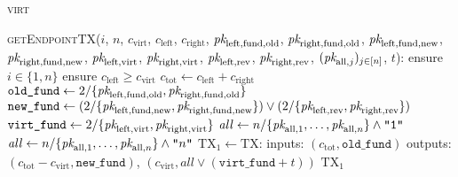 \begin{center}
  \begin{processbox}{\textsc{virt}}
    \begin{algorithmic}[1]
      \State {}
      \State \textsc{getEndpointTX}($i$, $n$, $c_{\mathrm{virt}}$,
      $c_{\mathrm{left}}$, $c_{\mathrm{right}}$, $\textit{pk}_{\mathrm{left},
      \mathrm{fund}, \mathrm{old}}$, $\textit{pk}_{\mathrm{right}, \mathrm{fund},
      \mathrm{old}}$, $\textit{pk}_{\mathrm{left}, \mathrm{fund}, \mathrm{new}}$,
      $\textit{pk}_{\mathrm{right}, \mathrm{fund}, \mathrm{new}}$, $\textit{pk}_{\mathrm{left},
      \mathrm{virt}}$, $\textit{pk}_{\mathrm{right}, \mathrm{virt}}$, $\textit{pk}_{\mathrm{left},
      \mathrm{rev}}$, $\textit{pk}_{\mathrm{right}, \mathrm{rev}}$, $(\textit{pk}_{\mathrm{all},
      j})_{j \in [n]}$, $t$):
      \Indent
        \State ensure $i \in \{1, n\}$
        \State ensure $c_{\mathrm{left}} \geq c_{\mathrm{virt}}$ 
        \State $c_{\mathrm{tot}} \gets c_{\mathrm{left}} + c_{\mathrm{right}}$
        \State $\texttt{old\_fund} \gets 2/\{\textit{pk}_{\mathrm{left}, \mathrm{fund},
        \mathrm{old}}, \textit{pk}_{\mathrm{right}, \mathrm{fund}, \mathrm{old}}\}$
        \State $\texttt{new\_fund} \gets (2/\{\textit{pk}_{\mathrm{left}, \mathrm{fund},
        \mathrm{new}}, \textit{pk}_{\mathrm{right}, \mathrm{fund}, \mathrm{new}}\}) \vee
        (2/\{\textit{pk}_{\mathrm{left}, \mathrm{rev}}, \textit{pk}_{\mathrm{right},
        \mathrm{rev}}\})$
        \State $\texttt{virt\_fund} \gets 2/\{\textit{pk}_{\mathrm{left},
        \mathrm{virt}}, \textit{pk}_{\mathrm{right}, \mathrm{virt}}\}$
         
          \State $\mathit{all} \gets n/\{\textit{pk}_{\mathrm{all}, 1}, \dots,
          \textit{pk}_{\mathrm{all}, n}\} \wedge \texttt{"1"}$
        \Else \: 
          \State $\mathit{all} \gets n/\{\textit{pk}_{\mathrm{all}, 1}, \dots,
          \textit{pk}_{\mathrm{all}, n}\} \wedge \texttt{"}n\texttt{"}$
        \EndIf
        \State $\mathrm{TX}_1 \gets \mathrm{TX}$: 
        \Indent
          \State inputs:
          \Indent
            \State $(c_{\mathrm{tot}}, \texttt{old\_fund})$
          \EndIndent
          \State outputs:
          \Indent
            \State $(c_{\mathrm{tot}} - c_{\mathrm{virt}}, \texttt{new\_fund})$,
            \label{code:virtual-layer:endpoint-txs:new-fund}
            \State $(c_{\mathrm{virt}}, \mathit{all} \vee (\texttt{virt\_fund} +
            t))$
            \label{code:virtual-layer:endpoint-txs:virt}
          \EndIndent
        \EndIndent
        \State \Return $\mathrm{TX}_1$
      \EndIndent
    \end{algorithmic}
  \end{processbox}
  \label{code:virtual-layer:endpoint-txs}
\end{center} \ \\

